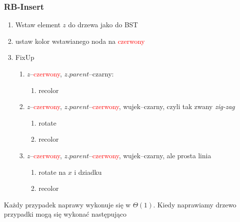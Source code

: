 \documentclass[11pt,a4paper]{article}
\begin{document}
\subsubsection{RB-Insert}
\begin{enumerate}
    \item Wstaw element $z$ do drzewa jako do BST
    \item ustaw kolor wstawianego noda na \textcolor{red}{czerwony}
    \item FixUp
        \begin{enumerate}
            \item $z$--\textcolor{red}{czerwony}, $z.parent$--czarny:
                \begin{enumerate}
                    \item recolor
                \end{enumerate}
            \item $z$--\textcolor{red}{czerwony}, $z.parent$--\textcolor{red}{czerwony}, wujek--czarny, czyli tak zwany \textit{zig-zag}
                \begin{enumerate}
                    \item rotate
                    \item recolor
                \end{enumerate}
            \item $z$--\textcolor{red}{czerwony}, $z.parent$--\textcolor{red}{czerwony}, wujek--czarny, ale prosta linia

                \begin{enumerate}
                    \item rotate na $x$ i dziadku
                    \item recolor
                \end{enumerate}
        \end{enumerate}
\end{enumerate}
Każdy przypadek naprawy wykonuje się w $\Theta(1)$. Kiedy naprawiamy drzewo przypadki mogą się wykonać następująco
\end{document}

